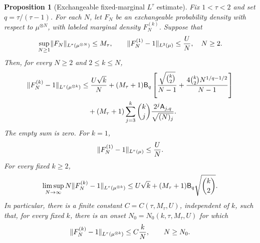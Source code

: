 \documentclass[11pt,reqno]{amsart}
\numberwithin{equation}{section}
\theoremstyle{plain}
\newtheorem{prop}[prop]{Proposition}
\theoremstyle{remark}
\DeclarePairedDelimiter{\norm}{\lVert}{\rVert}
\begin{document}
\begin{prop}[Exchangeable fixed-marginal \(L^\tau\) estimate]
\label{prop:abstract-fixed-marginal-Ltau}
Fix \(1<\tau<2\) and set \(q=\tau/(\tau-1)\).  For each \(N\), let \(F_N\) be an exchangeable probability density with respect to \(\mu^{\otimes N}\), with labeled marginal density \(F_N^{(k)}\).  Suppose that
\begin{align}\label{eq:abstract-fixed-marginal-assumptions}
 \sup_{N\ge1}\norm{F_N}_{L^\tau(\mu^{\otimes N})}\le M_\tau,
 \qquad
 \norm{F_N^{(1)}-1}_{L^2(\mu)}\le\frac{U}{N},
 \quad N\ge2.
\end{align}
Then, for every \(N\ge2\) and \(2\le k\le N\),
\begin{align}\label{eq:abstract-fixed-marginal-explicit}
 \norm{F_N^{(k)}-1}_{L^\tau(\mu^{\otimes k})}
 &\le \frac{U\sqrt{k}}{N}
 +(M_\tau+1)\mathsf B_q
 \left[
 \frac{\sqrt{\binom{k}{2}}}{N-1}
 +\frac{4\binom{k}{2}N^{1/q-1/2}}{N-1}
 \right]\notag\\
 &\quad +(M_\tau+1)\sum_{j=3}^k\binom{k}{j}
 \frac{2^j\mathsf A_{j,q}}{\sqrt{(N)_j}}.
\end{align}
The empty sum is zero.  For \(k=1\),
\begin{align}\label{eq:abstract-fixed-marginal-one-point}
 \norm{F_N^{(1)}-1}_{L^\tau(\mu)}\le\frac{U}{N}.
\end{align}
For every fixed \(k\ge2\),
\begin{align}\label{eq:abstract-fixed-marginal-limsup}
 \limsup_{N\to\infty}
 N\norm{F_N^{(k)}-1}_{L^\tau(\mu^{\otimes k})}
 \le U\sqrt{k}+(M_\tau+1)\mathsf B_q\sqrt{\binom{k}{2}}.
\end{align}
In particular, there is a finite constant \(C=C(\tau,M_\tau,U)\), independent of \(k\), such that, for every fixed \(k\), there is an onset \(N_0=N_0(k,\tau,M_\tau,U)\) for which
\begin{align}\label{eq:abstract-fixed-marginal-linear-k}
 \norm{F_N^{(k)}-1}_{L^\tau(\mu^{\otimes k})}
 \le C\frac{k}{N},
 \qquad N\ge N_0.
\end{align}
\end{prop}
\end{document}
